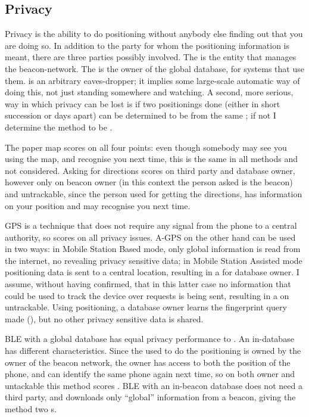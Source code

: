 \subsection{Privacy}
Privacy is the ability to do positioning without anybody else finding out that you are doing so.
In addition to the party for whom the positioning information is meant, there are three parties possibly involved.
The  is the entity that manages the beacon-network.
The  is the owner of the global database, for systems that use them.
 is an arbitrary eaves-dropper; it implies some large-scale automatic way of doing this, not just standing somewhere and watching.
A second, more serious, way in which privacy can be lost is if two positionings done (either in short succession or days apart) can be determined to be from the same \device; if not I determine the method to be .

The paper map scores \yes on all four points: even though somebody may see you using the map, and recognise you next time, this is the same in all methods and not considered.
Asking for directions scores \yes on third party and database owner, however only \maybe on beacon owner (in this context the person asked is the beacon) and untrackable, since the person used for getting the directions, has information on your position and may recognise you next time.

GPS is a technique that does not require any signal from the phone to a central authority, so scores \yes on all privacy issues.
A-GPS on the other hand can be used in two ways: in Mobile Station Based mode, only global information is read from the internet, no revealing privacy sensitive data; in Mobile Station Assisted mode positioning data is sent to a central location, resulting in a \maybe for database owner.
I assume, without having confirmed, that in this latter case no information that could be used to track the device over requests is being sent, resulting in a \yes on untrackable.
Using \wifi positioning, a database owner learns the fingerprint query made (\no), but no other privacy sensitive data is shared.

BLE with a global database has equal privacy performance to \wifi.
An in-\app database has different characteristics.
Since the \app used to do the positioning is owned by the owner of the beacon network, the owner has access to both the position of the phone, and can identify the same phone again next time, so on both owner and untackable this method scores \no.
BLE with an in-beacon database does not need a third party, and downloads only ``global'' information from a beacon, giving the method two \yes s.

